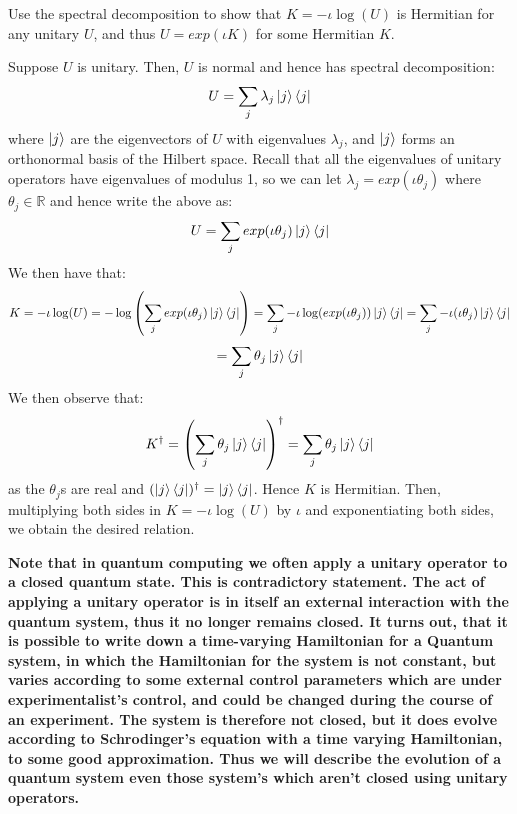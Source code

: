 \begin{example}
    Use the spectral decomposition to show that $K=-\iota \log(U)$ is Hermitian for any unitary $U$, and thus $U=exp(\iota K)$ for some Hermitian $K$.

    Suppose $U$ is unitary. Then, $U$ is normal and hence has spectral decomposition:
    \[
    U=\sum_j \lambda_j \ket{j}\bra{j}
    \]
    where $\ket{j}$ are the eigenvectors of $U$ with eigenvalues $\lambda_j$, and $\ket{j}$ forms an orthonormal basis of the Hilbert space. Recall that all the eigenvalues of unitary operators have eigenvalues of modulus 1, so we can let $\lambda_j=exp(\iota \theta_j)$ where $\theta_j \in \mathbb{R}$ and hence write the above as:
    \[
    U=\sum_j exp(\iota \theta_j) \ket{j}\bra{j}
    \]
    We then have that:
    \[
    K=-\iota \log(U)=-\log \left(\sum_j exp(\iota \theta_j)\ket{j}\bra{j}\right)=\sum_j -\iota \log(exp(\iota \theta_j))\ket{j}\bra{j}=\sum_j-\iota (\iota \theta_j)\ket{j}\bra{j}
    \]
    \[
    =\sum_j \theta_j \ket{j}\bra{j}
    \]
    We then observe that:
    \[
    K^{\dagger}=\left(\sum_j \theta_j \ket{j}\bra{j}\right)^{\dagger}=\sum_j \theta_j \ket{j}\bra{j}
    \]
    as the $\theta_j$s are real and $(\ket{j}\bra{j})^{\dagger}=\ket{j}\bra{j}$. Hence $K$ is Hermitian. Then, multiplying both sides in $K=-\iota\log(U)$ by $\iota$ and exponentiating both sides, we obtain the desired relation. 
\end{example}
\textbf{Note that in quantum computing we often apply a unitary operator to a closed quantum state. This is contradictory statement.
The act of applying a unitary operator is in itself an external interaction with the quantum system, thus it no longer remains closed. 
It turns out, that it is possible to write down a time-varying Hamiltonian for a Quantum system, in which the Hamiltonian for the system is not constant,
but varies according to some external control parameters which are under experimentalist's control, and could be changed during the 
course of an experiment. The system is therefore not closed, but it does evolve according to Schrodinger's equation with a time varying Hamiltonian, to some good
approximation. Thus we will describe the evolution of a quantum system even those system's which aren't closed using unitary operators.}

